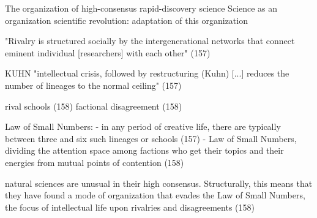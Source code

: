 










The organization of high-consensus rapid-discovery science
Science as an organization
scientific revolution: adaptation of this organization

"Rivalry is structured socially by the intergenerational networks that connect eminent individual [researchers] with each other" (157)

KUHN
"intellectual crisis, followed by restructuring (Kuhn) [...]
reduces the number of lineages to the normal ceiling" (157)

rival schools (158)
factional disagreement (158)

Law of Small Numbers:
- in any period of creative life, there are typically between three and six such lineages or schools (157)
- Law of Small Numbers, dividing the attention space among factions who get their topics and their energies from mutual points of contention (158)

natural sciences are unusual in their high consensus. Structurally, this means that they have found a mode of organization that evades the Law of Small Numbers, the focus of intellectual life upon rivalries and disagreements (158)

